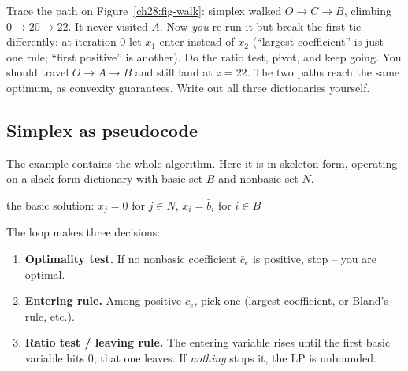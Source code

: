 \begin{labbox}
Trace the path on Figure~\ref{ch28:fig-walk}: simplex walked $O \to C \to B$, climbing
$0 \to 20 \to 22$. It never visited $A$. Now \emph{you} re-run it but break the
first tie differently: at iteration 0 let $x_1$ enter instead of $x_2$
(``largest coefficient'' is just one rule; ``first positive'' is another).
Do the ratio test, pivot, and keep going. You should travel $O \to A \to B$
and still land at $z=22$. The two paths reach the same optimum, as
convexity guarantees. Write out all three dictionaries yourself.
\end{labbox}

\subsection{Simplex as pseudocode}

The example contains the whole algorithm. Here it is in skeleton form,
operating on a slack-form dictionary with basic set $B$ and nonbasic set $N$.

\begin{algorithm}[H]
\caption{\textsc{Simplex} (one phase, on a feasible dictionary)}
\Return the basic solution: $x_j = 0$ for $j\in N$, $x_i = \bar b_i$ for $i\in B$\;
\end{algorithm}

\begin{focusbox}
The loop makes three decisions:
\begin{enumerate}
\item \textbf{Optimality test.} If no nonbasic coefficient $\bar c_e$ is
  positive, stop -- you are optimal.
\item \textbf{Entering rule.} Among positive $\bar c_e$, pick one (largest
  coefficient, or Bland's rule, etc.).
\item \textbf{Ratio test / leaving rule.} The entering variable rises until the
  first basic variable hits 0; that one leaves. If \emph{nothing} stops it, the
  LP is unbounded.
\end{enumerate}
\end{focusbox}

